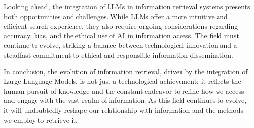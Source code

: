 \documentclass{article}
\begin{document}
Looking ahead, the integration of LLMs in information retrieval systems presents both opportunities and challenges. While LLMs offer a more intuitive and efficient search experience, they also require ongoing considerations regarding accuracy, bias, and the ethical use of AI in information access. The field must continue to evolve, striking a balance between technological innovation and a steadfast commitment to ethical and responsible information dissemination. 

In conclusion, the evolution of information retrieval, driven by the integration of Large Language Models, is not just a technological achievement; it reflects the human pursuit of knowledge and the constant endeavor to refine how we access and engage with the vast realm of information. As this field continues to evolve, it will undoubtedly reshape our relationship with information and the methods we employ to retrieve it.


 
\end{document}
